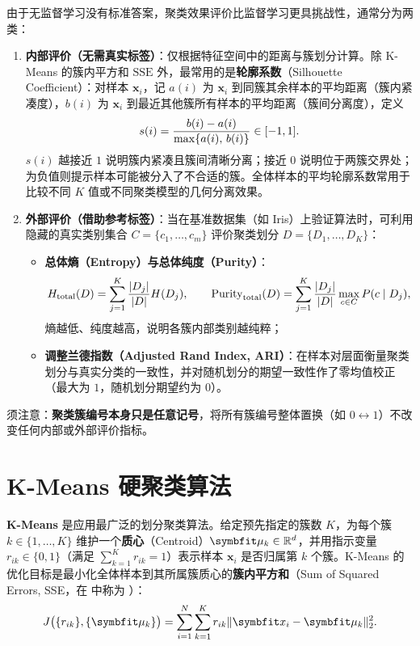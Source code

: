 由于无监督学习没有标准答案，聚类效果评价比监督学习更具挑战性，通常分为两类：
\begin{enumerate}
  \item \textbf{内部评价（无需真实标签）}：仅根据特征空间中的距离与簇划分计算。除 K-Means 的簇内平方和 $\mathrm{SSE}$ 外，最常用的是\textbf{轮廓系数}（Silhouette Coefficient）：对样本 $\bm{x}_i$，记 $a(i)$ 为 $\bm{x}_i$ 到同簇其余样本的平均距离（簇内紧凑度），$b(i)$ 为 $\bm{x}_i$ 到最近其他簇所有样本的平均距离（簇间分离度），定义
  \begin{equation}\label{eq:silhouette}
    s(i) = \frac{b(i) - a(i)}{\max\{a(i),\, b(i)\}} \in [-1, 1].
  \end{equation}
  $s(i)$ 越接近 $1$ 说明簇内紧凑且簇间清晰分离；接近 $0$ 说明位于两簇交界处；为负值则提示样本可能被分入了不合适的簇。全体样本的平均轮廓系数常用于比较不同 $K$ 值或不同聚类模型的几何分离效果。
  \item \textbf{外部评价（借助参考标签）}：当在基准数据集（如 Iris）上验证算法时，可利用隐藏的真实类别集合 $C = \{c_1, \dots, c_m\}$ 评价聚类划分 $D = \{D_1, \dots, D_K\}$：
  \begin{itemize}
    \item \textbf{总体熵（Entropy）与总体纯度（Purity）}：
    \begin{equation}\label{eq:cluster-purity-entropy}
      H_{\text{total}}(D) = \sum_{j=1}^{K}\frac{\lvert D_j\rvert}{\lvert D\rvert} H(D_j),\qquad
      \mathrm{Purity}_{\text{total}}(D) = \sum_{j=1}^{K}\frac{\lvert D_j\rvert}{\lvert D\rvert} \max_{c\in C} P(c\mid D_j),
    \end{equation}
    熵越低、纯度越高，说明各簇内部类别越纯粹；
    \item \textbf{调整兰德指数（Adjusted Rand Index, ARI）}：在样本对层面衡量聚类划分与真实分类的一致性，并对随机划分的期望一致性作了零均值校正（最大为 $1$，随机划分期望约为 $0$）。
  \end{itemize}
\end{enumerate}
须注意：\textbf{聚类簇编号本身只是任意记号}，将所有簇编号整体置换（如 $0\leftrightarrow 1$）不改变任何内部或外部评价指标。

\section{K-Means 硬聚类算法}\label{sec:kmeans}

\textbf{K-Means} 是应用最广泛的划分聚类算法。给定预先指定的簇数 $K$，为每个簇 $k\in\{1,\dots,K\}$ 维护一个\textbf{质心}（Centroid）$\bm{\mu}_k\in\R^d$，并用指示变量 $r_{ik}\in\{0,1\}$（满足 $\sum_{k=1}^{K} r_{ik} = 1$）表示样本 $\bm{x}_i$ 是否归属第 $k$ 个簇。K-Means 的优化目标是最小化全体样本到其所属簇质心的\textbf{簇内平方和}（Sum of Squared Errors, SSE，在  中称为 ）：
\begin{equation}\label{eq:kmeans-sse}
  J\bigl(\{r_{ik}\}, \{\bm{\mu}_k\}\bigr) = \sum_{i=1}^{N}\sum_{k=1}^{K} r_{ik}\norm{\bm{x}_i - \bm{\mu}_k}_2^2.
\end{equation}


